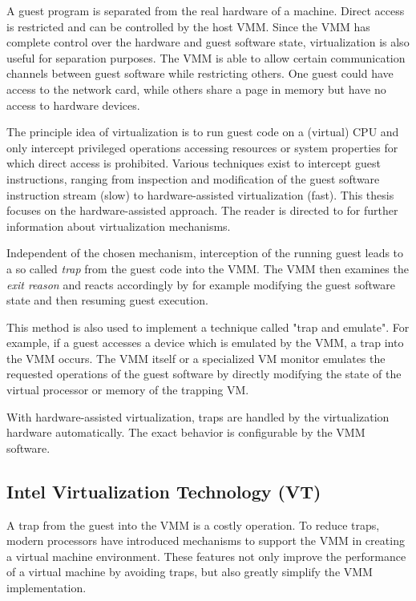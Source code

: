 A guest program is separated from the real hardware of a machine. Direct access
is restricted and can be controlled by the host VMM. Since the VMM has complete
control over the hardware and guest software state, virtualization is also
useful for separation purposes. The VMM is able to allow certain communication
channels between guest software while restricting others. One guest could have
access to the network card, while others share a page in memory but have no
access to hardware devices.

The principle idea of virtualization is to run guest code on a (virtual) CPU
and only intercept privileged operations accessing resources or system
properties for which direct access is prohibited. Various techniques exist to
intercept guest instructions, ranging from inspection and modification of the
guest software instruction stream (slow) to hardware-assisted virtualization
(fast). This thesis focuses on the hardware-assisted approach. The reader is
directed to \cite{VMware:virtualization} for further information about
virtualization mechanisms.

Independent of the chosen mechanism, interception of the running guest leads to
a so called \emph{trap} from the guest code into the VMM. The VMM
then examines the \emph{exit reason} and reacts accordingly by for example
modifying the guest software state and then resuming guest execution.

This method is also used to implement a technique called "trap and emulate".
For example, if a guest accesses a device which is emulated by the VMM, a trap
into the VMM occurs. The VMM itself or a specialized VM monitor emulates the
requested operations of the guest software by directly modifying the state of
the virtual processor or memory of the trapping VM.

With hardware-assisted virtualization, traps are handled by the virtualization
hardware automatically. The exact behavior is configurable by the VMM software.

\subsection{Intel Virtualization Technology (VT)}
A trap from the guest into the VMM is a costly operation. To reduce traps,
modern processors have introduced mechanisms to support the VMM in creating a
virtual machine environment. These features not only improve the performance of
a virtual machine by avoiding traps, but also greatly simplify the VMM
implementation.

